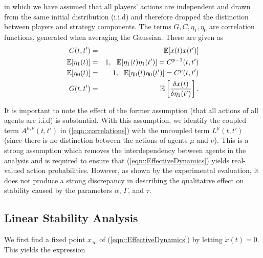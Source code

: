 \documentclass[sigconf,anonymous]{aamas}
\newcommand{\xfixed}{x_\infty}
\begin{document}
in which we have assumed that all players' actions are independent and drawn from the same initial distribution (i.i.d)
and therefore dropped the distinction between players and strategy components. The terms $G, C, \eta_1, \eta_0$ are correlation functions, generated when averaging the Gaussian. These are given as 
%
\begin{eqnarray*}
        C(t, t') & = & \mathbb{E}[x(t) x(t')] \\
        \mathbb{E}[\eta_1(t)] & = & 1, \text{ \space } \mathbb{E}[\eta_1(t) \eta_1(t')]  =  C^{p-1}(t, t') \\
        \mathbb{E}[\eta_0(t)] & = & 1, \text{ \space } \mathbb{E}[\eta_0(t) \eta_0(t')] = C^{p}(t, t') \\
        G(t, t') & = & \mathbb{E}\left [ \frac{\delta x(t)}{ \delta \eta_1(t')} \right].
\end{eqnarray*}

It is important to note the effect of the former assumption (that all
actions of all agents are i.i.d) is substantial. With this assumption,
we identify the coupled term $A^{\mu, \nu} (t, t')$ in
(\ref{eqn::correlations}) with the uncoupled term $L^\mu (t, t')$
(since there is no distinction between the actions of agents $\mu$ and
$\nu$). This is a strong assumption which removes the interdependency
between agents in the analysis and is required to ensure that (\ref{eqn::EffectiveDynamics}) yields real-valued action probabilities. However, as shown by the experimental
evaluation, it does not produce a strong discrepancy in describing the
qualitative effect on stability caused by the parameters $\alpha$, $\Gamma$, and $\tau$.

\subsection{Linear Stability Analysis}

We first find a fixed point $\xfixed$ of (\ref{eqn::EffectiveDynamics}) by letting $\dot{x}(t)= 0$. This yields the expression 
\end{document}
